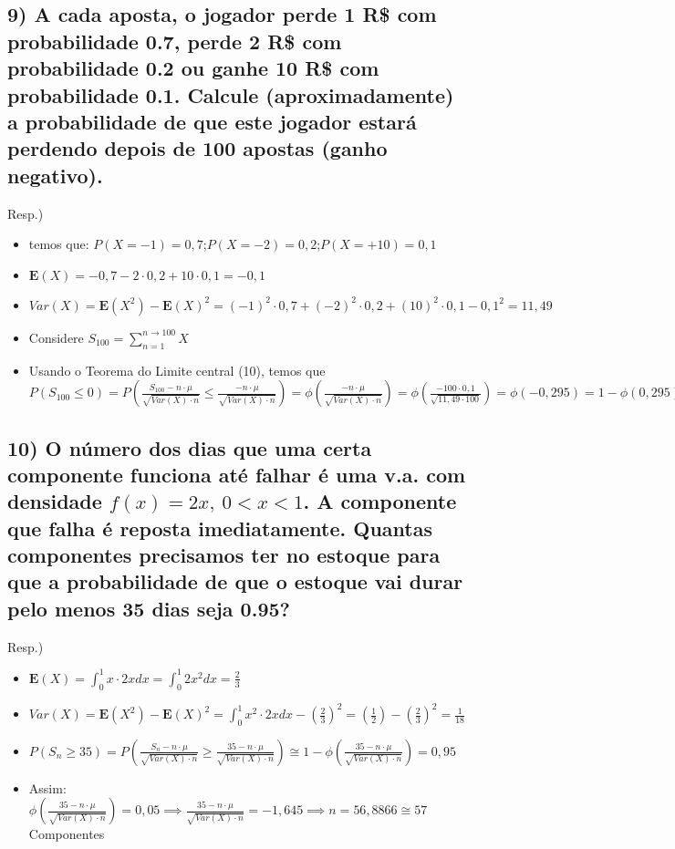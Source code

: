 \documentclass[english]{article}
\begin{document}
\subsection*{\textcompwordmark{}}


\subsection*{\textmd{9) A cada aposta, o jogador perde 1 R\$ com probabilidade
0.7, perde 2 R\$ com probabilidade 0.2 ou ganhe 10 R\$ com probabilidade
0.1. Calcule (aproximadamente) a probabilidade de que este jogador
estará perdendo depois de 100 apostas (ganho negativo).}}

Resp.)
\begin{itemize}
\item temos que: $P(X=-1)=0,7$;$P(X=-2)=0,2$;$P(X=+10)=0,1$
\item $\mathbf{E}(X)=-0,7-2\cdot0,2+10\cdot0,1=-0,1$
\item $Var(X)=\mathbf{E}(X^{2})-\mathbf{E}(X)^{2}=(-1)^{2}\cdot0,7+(-2)^{2}\cdot0,2+(10)^{2}\cdot0,1-0,1^{2}=11,49$
\item Considere $S_{100}=\sum_{n=1}^{n\to100}X$
\item Usando o Teorema do Limite central (10), temos que $P(S_{100}\le0)=P(\frac{S_{100}-n\cdot\mu}{\sqrt{Var(X)\cdot n}}\le\frac{-n\cdot\mu}{\sqrt{Var(X)\cdot n}})=\phi(\frac{-n\cdot\mu}{\sqrt{Var(X)\cdot n}})=\phi(\frac{-100\cdot0,1}{\sqrt{11,49\cdot100}})=\phi(-0,295)=1-\phi(0,295)\cong0,384$
\end{itemize}

\subsection*{\textcompwordmark{}}


\subsection*{\textmd{10) O número dos dias que uma certa componente funciona até
falhar é uma v.a. com densidade $f(x)=2x,\ 0<x<1$. A componente que
falha é reposta imediatamente. Quantas componentes precisamos ter
no estoque para que a probabilidade de que o estoque vai durar pelo
menos 35 dias seja 0.95?}}

Resp.) 
\begin{itemize}
\item $\mathbf{E}(X)=\int_{0}^{1}x\cdot2xdx=\int_{0}^{1}2x^{2}dx=\frac{2}{3}$
\item $Var(X)=\mathbf{E}(X^{2})-\mathbf{E}(X)^{2}=\int_{0}^{1}x^{2}\cdot2xdx-\left(\frac{2}{3}\right)^{2}=\left(\frac{1}{2}\right)-\left(\frac{2}{3}\right)^{2}=\frac{1}{18}$
\item $P(S_{n}\ge35)=P(\frac{S_{n}-n\cdot\mu}{\sqrt{Var(X)\cdot n}}\ge\frac{35-n\cdot\mu}{\sqrt{Var(X)\cdot n}})\cong1-\phi(\frac{35-n\cdot\mu}{\sqrt{Var(X)\cdot n}})=0,95$
\item Assim: $\phi(\frac{35-n\cdot\mu}{\sqrt{Var(X)\cdot n}})=0,05\implies\frac{35-n\cdot\mu}{\sqrt{Var(X)\cdot n}}=-1,645\implies n=56,8866\cong57$
Componentes
\end{itemize}
\end{document}
